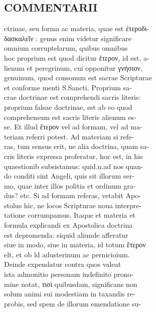 \documentclass{article}
\begin{document}
\begin{pages}
\section*{COMMENTARII \\
                }
ctrinae, seu forma ac materia, quae est έτεροδι- \\
                δασκαλεῖν : genus enim videtur significare \\
                omnium corruptelarum, quibus omnibus \\
                hoc proprium est quod dicitur ἕτερον, id est, a- \\
                lienum et peregrinum, cui opponitur γνήσιον, \\
                genuinum, quod consonum est sacrae Scripturae \\
                et conforme menti S.Sancti. Proprium sa- \\
                crae doctrinae est comprehendi sacris literis: \\
                proprium falsae doctrinae, est ab eo quod \\
                comprehensum est sacris literis alienum es- \\
                se. Et illud ἕτερον vel ad formam, vel ad ma- \\
                teriam referri potest. Ad materiam si refe- \\
                ras, tum sensus erit, ne alia doctrina, quam sa- \\
                cris literis expressa proferatur, hoc est, in his \\
                quaestionib subsistamus: quid.n.ad nos quan- \\
                do conditi sint Angeli, quis sit illorum ser- \\
                mo, quae inter illos politia et ordinum gra- \\
                dus? etc. Si ad formam referas, vetabit Apo- \\
                stolus hic, ne locos Scripturae noua interpre- \\
                tatione corrumpamus. Itaque et materia et \\
                formula explicandi ex Apostolica doctrina \\
                est depromenda: siquid aliunde afferatur \\
                siue in modo, siue in materia, id totum ἕτερον \\
                elt, et ob ld adusterinum ac pernicioium. \\
                Deinde expendatur contra quos valeat \\
                ista admonitio personam indefinito prono- \\
                mine notat, τισὶ quibusdam, significans non \\
                solum animi sui modestiam in taxandis re- \\
                probis, sed spem de illorum emendatione su- \\
                

\end{pages}
\end{document}
